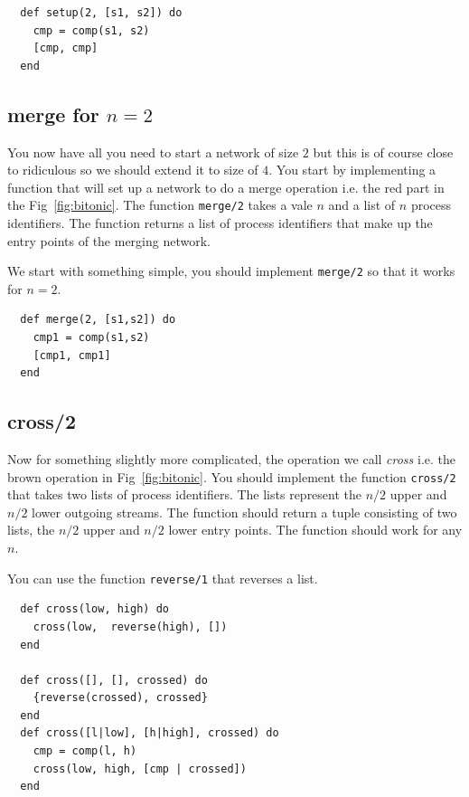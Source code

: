 \documentclass[a4paper,11pt]{article}
\begin{document}
\begin{verbatim}
  def setup(2, [s1, s2]) do
    cmp = comp(s1, s2)
    [cmp, cmp]
  end
\end{verbatim}


\subsection{merge for $n = 2$}

You now have all you need to start a network of size $2$ but this is
  of course close to ridiculous so we should extend it to size of
  $4$. You start by implementing a function that will set up a network
  to do a merge operation i.e. the red part in the
  Fig~\ref{fig:bitonic}. The function {\tt merge/2} takes a vale $n$
  and a list of $n$ process identifiers. The function returns a list
  of process identifiers that make up the entry points of the merging
  network.

  We start with something simple, you should implement {\tt merge/2}
  so that it works for $n = 2$.


\begin{verbatim}
  def merge(2, [s1,s2]) do
    cmp1 = comp(s1,s2)
    [cmp1, cmp1]
  end
\end{verbatim}

\subsection{cross/2}

Now for something slightly more complicated, the operation we call
  {\em cross} i.e. the brown operation in Fig~\ref{fig:bitonic}. You
  should implement the function {\tt cross/2} that takes two lists of
  process identifiers. The lists represent the $n/2$ upper and $n/2$
  lower outgoing streams. The function should return a tuple
  consisting of two lists, the $n/2$ upper and $n/2$ lower entry
  points. The function should work for any $n$.



You can use the function {\tt reverse/1} that reverses a list.

\begin{verbatim}
  def cross(low, high) do
    cross(low,  reverse(high), [])
  end

  def cross([], [], crossed) do
    {reverse(crossed), crossed}
  end
  def cross([l|low], [h|high], crossed) do
    cmp = comp(l, h)
    cross(low, high, [cmp | crossed])
  end
\end{verbatim}
\end{document}
